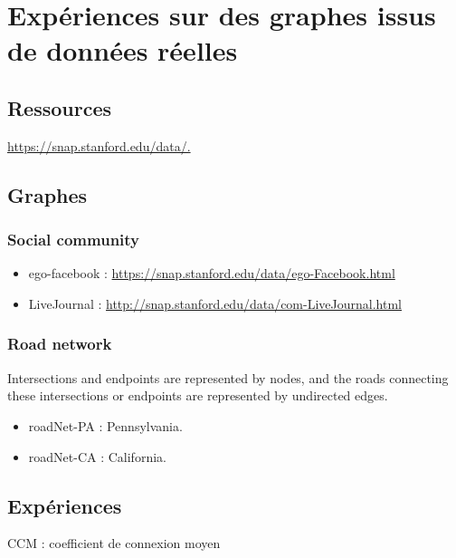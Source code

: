 \newpage

\section{Expériences sur des graphes issus de données réelles }

\subsection{Ressources }

\cite{snapnets}



\href{https://snap.stanford.edu/data/.}{https://snap.stanford.edu/data/.}

\subsection{Graphes }
\subsubsection{Social community}
\begin{itemize}
    \item ego-facebook :
    \href{https://snap.stanford.edu/data/ego-Facebook.html
    }{https://snap.stanford.edu/data/ego-Facebook.html
    }
    \item LiveJournal :
    \href{http://snap.stanford.edu/data/com-LiveJournal.html}{http://snap.stanford.edu/data/com-LiveJournal.html
    }

\end{itemize}

\subsubsection{Road network}
Intersections and endpoints are represented by nodes, and the roads connecting these intersections or endpoints are represented by undirected edges.

\begin{itemize}
    \item roadNet-PA : Pennsylvania.
    \item roadNet-CA : California.
\end{itemize}


\subsection{Expériences }
CCM : coefficient de connexion moyen


